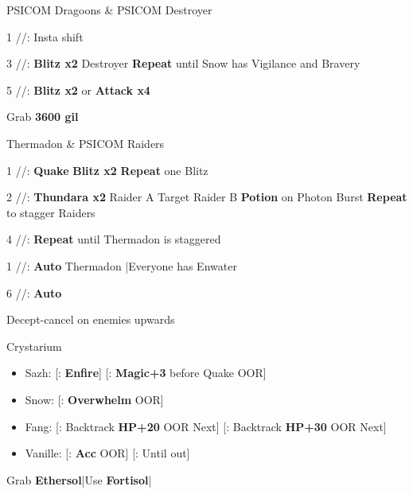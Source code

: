 \begin{fight}{PSICOM Dragoons \& PSICOM Destroyer}
	\item [1] \com/\syn/\com: Insta shift
	\item [3] \com/\syn/\sen: \textbf{Blitz x2} Destroyer \to \textbf{Repeat} until Snow has Vigilance and Bravery
	\item [5] \com/\com/\com: \textbf{Blitz x2} or \textbf{Attack x4}
\end{fight}
\begin{mainlist}
	\item Grab \textbf{3600 gil}
\end{mainlist}
\begin{fight}{Thermadon \& PSICOM Raiders}
	\item [1] \com/\syn/\com: \textbf{Quake} \to \textbf{Blitz x2} \to \textbf{Repeat} one Blitz
	\item [2] \rav/\rav/\rav: \textbf{Thundara x2} Raider A \to Target Raider B \to \textbf{Potion} on Photon Burst \to \textbf{Repeat} to stagger Raiders
	\item [4] \rav/\rav/\rav: \textbf{Repeat} until Thermadon is staggered
	\item [1] \com/\syn/\com: \textbf{Auto} Thermadon |Everyone has Enwater
	\item [6] \com/\com/\com: \textbf{Auto}
\end{fight}
\begin{mainlist}
	\item Decept-cancel on enemies upwards
\end{mainlist}
\begin{menu}
	\item Crystarium
	\begin{itemize}
		\item Sazh: [\syn: \textbf{Enfire}] [\com: \textbf{Magic+3} before Quake OOR]
		\item Snow: [\rav: \textbf{Overwhelm} OOR]
		\item Fang: [\com: Backtrack \textbf{HP+20} OOR \to Next] [\sab: Backtrack \textbf{HP+30} OOR \to Next]
		\item Vanille: [\sab: \textbf{Acc} OOR] [\med: Until out]
	\end{itemize}
\end{menu}
\begin{mainlist}
	\item Grab \textbf{Ethersol}|Use \textbf{Fortisol}|\skip
\end{mainlist}

